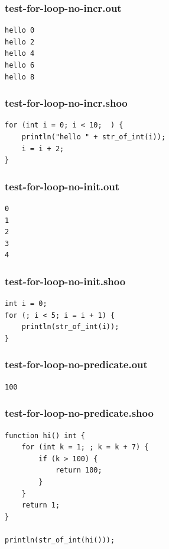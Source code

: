 \documentclass[12pt]{article}
\begin{document}
\subsubsection{test-for-loop-no-incr.out}
\begin{mdframed}[hidealllines=true,backgroundcolor=green!10]
\begin{lstlisting}
hello 0
hello 2
hello 4
hello 6
hello 8
\end{lstlisting}
\end{mdframed}
\subsubsection{test-for-loop-no-incr.shoo}
\begin{mdframed}[hidealllines=true,backgroundcolor=blue!10]
\begin{lstlisting}
for (int i = 0; i < 10;  ) {
    println("hello " + str_of_int(i));
    i = i + 2;
}
\end{lstlisting}
\end{mdframed}
\subsubsection{test-for-loop-no-init.out}
\begin{mdframed}[hidealllines=true,backgroundcolor=green!10]
\begin{lstlisting}
0
1
2
3
4
\end{lstlisting}
\end{mdframed}
\subsubsection{test-for-loop-no-init.shoo}
\begin{mdframed}[hidealllines=true,backgroundcolor=blue!10]
\begin{lstlisting}
int i = 0;
for (; i < 5; i = i + 1) {
    println(str_of_int(i));
}
\end{lstlisting}
\end{mdframed}
\subsubsection{test-for-loop-no-predicate.out}
\begin{mdframed}[hidealllines=true,backgroundcolor=green!10]
\begin{lstlisting}
100
\end{lstlisting}
\end{mdframed}
\subsubsection{test-for-loop-no-predicate.shoo}
\begin{mdframed}[hidealllines=true,backgroundcolor=blue!10]
\begin{lstlisting}
function hi() int {
    for (int k = 1; ; k = k + 7) {
        if (k > 100) {
            return 100;
        }
    }
    return 1;
}

println(str_of_int(hi())); 
\end{lstlisting}
\end{mdframed}
\end{document}
